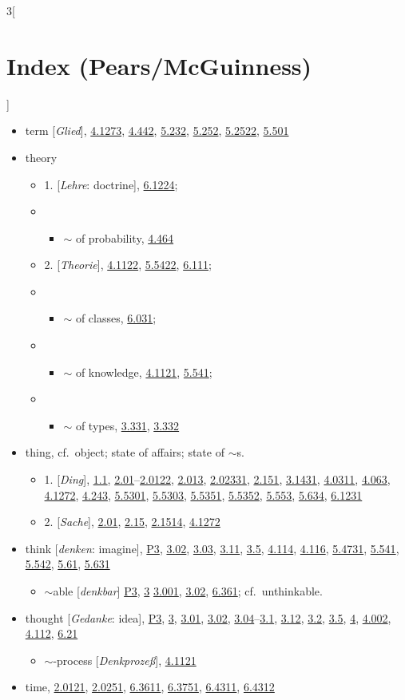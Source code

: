 \documentclass[oneside,openany,12pt]{book}
\newcommand{\indexentry}[1]{\item #1}
\newcommand{\indexsubentry}[1]{\begin{itemize} \item #1 \end{itemize}}
\newcommand{\indexsubsubentry}[1]{\begin{itemize} \item \begin{itemize} \item #1 \end{itemize} \end{itemize}}
\newcommand{\indexref}[1]{\hyperlink{prop#1}{#1}}
\begin{document}
\begin{multicols}{3}[\section*{Index (Pears/McGuinness)}]
\begin{itemize}
\indexentry{term [\textit{Glied}], \indexref{4.1273}, \indexref{4.442}, \indexref{5.232}, \indexref{5.252}, \indexref{5.2522}, \indexref{5.501}}

\indexentry{theory}

   \indexsubentry{1. [\textit{Lehre}: doctrine], \indexref{6.1224};}

   \indexsubsubentry{$\sim$ of probability, \indexref{4.464}}

   \indexsubentry{2. [\textit{Theorie}], \indexref{4.1122}, \indexref{5.5422}, \indexref{6.111};}

   \indexsubsubentry{$\sim$ of classes, \indexref{6.031};}

   \indexsubsubentry{$\sim$ of knowledge, \indexref{4.1121}, \indexref{5.541};}

   \indexsubsubentry{$\sim$ of types, \indexref{3.331}, \indexref{3.332}}

\indexentry{thing, cf.\ object; state of affairs; state of $\sim$s.}

   \indexsubentry{1. [\textit{Ding}], \indexref{1.1}, \indexref{2.01}--\indexref{2.0122}, \indexref{2.013}, \indexref{2.02331}, \indexref{2.151}, \indexref{3.1431}, \indexref{4.0311}, \indexref{4.063}, \indexref{4.1272}, \indexref{4.243}, \indexref{5.5301}, \indexref{5.5303}, \indexref{5.5351}, \indexref{5.5352}, \indexref{5.553}, \indexref{5.634}, \indexref{6.1231}}

   \indexsubentry{2. [\textit{Sache}], \indexref{2.01}, \indexref{2.15}, \indexref{2.1514}, \indexref{4.1272}}

\indexentry{think [\textit{denken}: imagine], \hyperlink{pref3}{P3}, \indexref{3.02}, \indexref{3.03}, \indexref{3.11}, \indexref{3.5}, \indexref{4.114}, \indexref{4.116}, \indexref{5.4731}, \indexref{5.541}, \indexref{5.542}, \indexref{5.61}, \indexref{5.631}}

   \indexsubentry{$\sim$able [\textit{denkbar}] \hyperlink{pref3}{P3}, \indexref{3} \indexref{3.001}, \indexref{3.02}, \indexref{6.361}; cf.\ unthinkable.}

\indexentry{thought [\textit{Gedanke}: idea], \hyperlink{pref3}{P3}, \indexref{3}, \indexref{3.01}, \indexref{3.02}, \indexref{3.04}--\indexref{3.1}, \indexref{3.12}, \indexref{3.2}, \indexref{3.5}, \indexref{4}, \indexref{4.002}, \indexref{4.112}, \indexref{6.21}}

   \indexsubentry{$\sim$-process [\textit{Denkproze{\ss}}], \indexref{4.1121}}

\indexentry{time, \indexref{2.0121}, \indexref{2.0251}, \indexref{6.3611}, \indexref{6.3751}, \indexref{6.4311}, \indexref{6.4312}}


\end{itemize}
\end{multicols}
\end{document}

